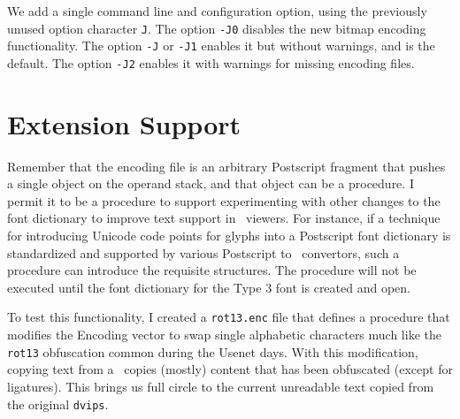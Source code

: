 \documentclass{ltugboat}
\def\PDF{\acro{PDF}}
\def\dvips{\texttt{dvips}}
\begin{document}
We add a single command line and configuration option, using the
previously unused option character \texttt{J}.  The option
\texttt{-J0} disables the new bitmap encoding functionality.
The option \texttt{-J} or \texttt{-J1} enables it but without
warnings, and is the default.  The option \texttt{-J2} enables
it with warnings for missing encoding files.

\section{Extension Support}

Remember that the encoding file is an arbitrary Postscript fragment
that pushes a single object on the operand stack, and that object
can be a procedure.  I permit it to be a procedure to support
experimenting with other changes to the font dictionary to improve
text support in \PDF\ viewers.  For instance, if a technique for
introducing Unicode code points for glyphs into a Postscript font
dictionary is standardized and supported by various Postscript
to \PDF\ convertors, such a procedure can introduce the requisite
structures.  The procedure will not be executed until the
font dictionary for the Type 3 font is created and open.

To test this functionality, I created a \texttt{rot13.enc} file
that defines a procedure that modifies the Encoding vector to swap
single alphabetic characters much like the \texttt{rot13} obfuscation
common during the Usenet days.  With this modification, copying
text from a \PDF\ copies (mostly) content that has been obfuscated
(except for ligatures).  This brings us full circle to the
current unreadable text copied from the original \dvips.




\makesignature
\end{document}
